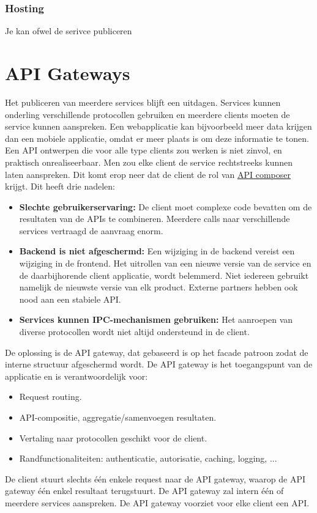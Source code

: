 \documentclass{report}
\begin{document}
\subsection{Hosting}
Je kan ofwel de serivce publiceren 

\chapter{API Gateways}
Het publiceren van meerdere services blijft een uitdagen. Services kunnen onderling verschillende protocollen gebruiken en meerdere clients moeten de service kunnen aanspreken. Een webapplicatie kan bijvoorbeeld meer data krijgen dan een mobiele applicatie, omdat er meer plaats is om deze informatie te tonen. Een API ontwerpen die voor alle type clients zou werken is niet zinvol, en praktisch onrealiseerbaar. Men zou elke client de service rechtstreeks kunnen laten aanspreken. Dit komt erop neer dat de client de rol van \underline{API composer} krijgt. Dit heeft drie nadelen:
\begin{itemize}
	\item[\alert] \textbf{Slechte gebruikerservaring:}  De client moet complexe code bevatten om de resultaten van de APIs te combineren. Meerdere calls naar verschillende services vertraagd de aanvraag enorm.
	\item[\alert] \textbf{Backend is niet afgeschermd:} Een wijziging in de backend vereist een wijziging in de frontend. Het uitrollen van een nieuwe versie van de service en de daarbijhorende client applicatie, wordt belemmerd. Niet iedereen gebruikt namelijk de nieuwste versie van elk product. Externe partners hebben ook nood aan een stabiele API. 
	\item[\alert] \textbf{Services kunnen IPC-mechanismen gebruiken:} Het aanroepen van diverse protocollen wordt niet altijd ondersteund in de client.
\end{itemize}
De oplossing is de API gateway, dat gebaseerd is op het facade patroon zodat de interne structuur afgeschermd wordt. De API gateway is het toegangspunt van de applicatie en is verantwoordelijk voor:
\begin{itemize}
	\item[\info] Request routing.
	\item[\info] API-compositie, aggregatie/samenvoegen resultaten.
	\item[\info] Vertaling naar protocollen geschikt voor de client.
	\item[\info] Randfunctionaliteiten: authenticatie, autorisatie, caching, logging, ...
\end{itemize}
De client stuurt slechts één enkele request naar de API gateway, waarop de API gateway één enkel resultaat terugstuurt. De API gateway zal intern één of meerdere services aanspreken. De API gateway voorziet voor elke client een API.
\end{document}
